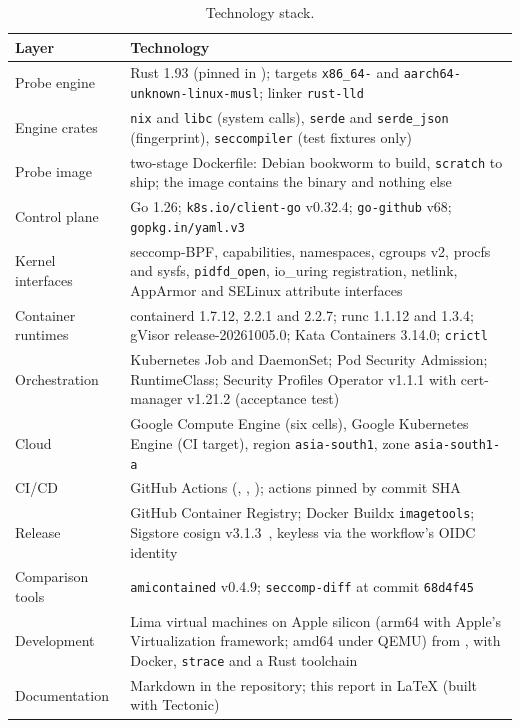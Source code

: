 \begin{table}[htbp]
\centering\small
\begin{tabularx}{\textwidth}{@{}P{3.4cm}L@{}}
\toprule
\textbf{Layer} & \textbf{Technology} \\
\midrule
Probe engine & Rust 1.93 (pinned in ); targets \texttt{x86\_64-} and \texttt{aarch64-unknown-linux-musl}; linker \texttt{rust-lld} \\
Engine crates & \texttt{nix} and \texttt{libc} (system calls), \texttt{serde} and \texttt{serde\_json} (fingerprint), \texttt{seccompiler} (test fixtures only) \\
Probe image & two-stage Dockerfile: Debian bookworm to build, \texttt{scratch} to ship; the image contains the binary and nothing else \\
Control plane & Go 1.26; \texttt{k8s.io/client-go} v0.32.4; \texttt{go-github} v68; \texttt{gopkg.in/yaml.v3} \\
Kernel interfaces & seccomp-BPF, capabilities, namespaces, cgroups v2, procfs and sysfs, \texttt{pidfd\_open}, io\_uring registration, netlink, AppArmor and SELinux attribute interfaces \\
Container runtimes & containerd 1.7.12, 2.2.1 and 2.2.7; runc 1.1.12 and 1.3.4; gVisor release-20261005.0; Kata Containers 3.14.0; \texttt{crictl} \\
Orchestration & Kubernetes Job and DaemonSet; Pod Security Admission; RuntimeClass; Security Profiles Operator v1.1.1 with cert-manager v1.21.2 (acceptance test) \\
Cloud & Google Compute Engine (six cells), Google Kubernetes Engine (CI target), region \texttt{asia-south1}, zone \texttt{asia-south1-a} \\
CI/CD & GitHub Actions (, , ); actions pinned by commit SHA \\
Release & GitHub Container Registry; Docker Buildx \texttt{imagetools}; Sigstore cosign v3.1.3~\cite{cosign}, keyless via the workflow's OIDC identity \\
Comparison tools & \texttt{amicontained} v0.4.9; \texttt{seccomp-diff} at commit \texttt{68d4f45} \\
Development & Lima virtual machines on Apple silicon (arm64 with Apple's Virtualization framework; amd64 under QEMU) from , with Docker, \texttt{strace} and a Rust toolchain \\
Documentation & Markdown in the repository; this report in \LaTeX{} (built with Tectonic) \\
\bottomrule
\end{tabularx}
\caption{Technology stack.}
\label{tab:stack}
\end{table}

